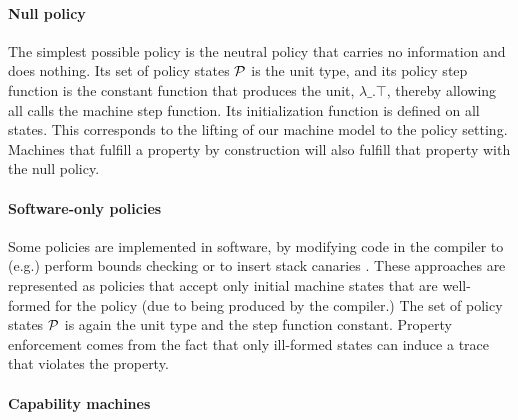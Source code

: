 \documentclass[acmsmall,review,anonymous]{acmart}\settopmatter{printfolios=true,printccs=false,printacmref=false}
\begin{document}

\paragraph*{Null policy}
%
The simplest possible policy is the neutral policy that carries no information
and does nothing. Its set of policy states $\mathcal{P}$ is the unit type, and its
policy step function is the constant function that produces the unit, $\lambda
\_ . \top$, thereby allowing all calls the machine step function. Its
initialization function is defined on all states. This corresponds to the
lifting of our machine model to the policy setting. Machines that fulfill a
property by construction will also fulfill that property with the null
policy.

\paragraph*{Software-only policies}
%
Some policies are implemented in software, by modifying code in the compiler
to (e.g.) perform bounds checking \citep{NagarakatteZMZ09} or to insert stack
canaries \citep{Cowan+98}. These approaches are represented as policies that
accept only initial machine states that are well-formed for the policy (due
to being produced by the compiler.) The set of policy states \(\mathcal{P}\) is again
the unit type and the step function constant. Property enforcement comes from
the fact that only ill-formed states can induce a trace that violates the
property.


\paragraph*{Capability machines}
%

\newcommand{\TAGS}{\mathcal{T}}
\newcommand{\tagname}{t}
\newcommand{\uP}{{\mu P}}
\end{document}
